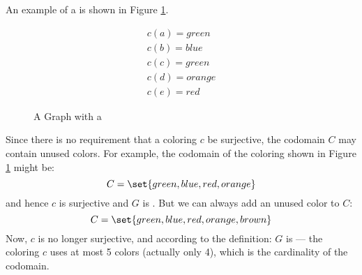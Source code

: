 An example of a  is shown in Figure \ref{fig:exproper}.

\begin{figure}[h]
  \label{fig:exproper}
  \begin{minipage}[t]{3in}
    \begin{center}
      \vspace{0in}
    \end{center}
  \end{minipage}
  \begin{minipage}[t]{3in}
    \begin{gather*}
      c(a)=green \\
      c(b)=blue \\
      c(c)=green \\
      c(d)=orange \\
      c(e)=red
    \end{gather*}
  \end{minipage}
  \caption{A Graph with a }
\end{figure}

Since there is no requirement that a coloring \(c\) be surjective, the codomain \(C\) may contain unused colors.
For example, the codomain of the coloring shown in Figure \ref{fig:exproper} might be:
\[C=\set{green,blue,red,orange}\]
and hence \(c\) is surjective and \(G\) is .  But we can always add an unused color to \(C\):
\[C=\set{green,blue,red,orange,brown}\]
Now, \(c\) is no longer surjective, and according to the definition: \(G\) is  --- the coloring \(c\)
uses at most 5 colors (actually only 4), which is the cardinality of the codomain.

